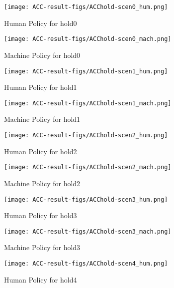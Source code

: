 \begin{figure}[h]
    \centering
    \texttt{[image: ACC-result-figs/ACChold-scen0\_hum.png]}
    \caption{Human Policy for hold0}
    \label{fig:hold-s0-hum}
\end{figure}

\begin{figure}[h]
    \centering
    \texttt{[image: ACC-result-figs/ACChold-scen0\_mach.png]}
    \caption{Machine Policy for hold0}
    \label{fig:hold-s0-mach}
\end{figure}

\begin{figure}[h]
    \centering
    \texttt{[image: ACC-result-figs/ACChold-scen1\_hum.png]}
    \caption{Human Policy for hold1}
    \label{fig:hold-s1-hum}
\end{figure}

\begin{figure}[h]
    \centering
    \texttt{[image: ACC-result-figs/ACChold-scen1\_mach.png]}
    \caption{Machine Policy for hold1}
    \label{fig:hold-s1-mach}
\end{figure}

\begin{figure}[h]
    \centering
    \texttt{[image: ACC-result-figs/ACChold-scen2\_hum.png]}
    \caption{Human Policy for hold2}
    \label{fig:hold-s2-hum}
\end{figure}

\begin{figure}[h]
    \centering
    \texttt{[image: ACC-result-figs/ACChold-scen2\_mach.png]}
    \caption{Machine Policy for hold2}
    \label{fig:hold-s2-mach}
\end{figure}

\begin{figure}[h]
    \centering
    \texttt{[image: ACC-result-figs/ACChold-scen3\_hum.png]}
    \caption{Human Policy for hold3}
    \label{fig:hold-s3-hum}
\end{figure}

\begin{figure}[h]
    \centering
    \texttt{[image: ACC-result-figs/ACChold-scen3\_mach.png]}
    \caption{Machine Policy for hold3}
    \label{fig:hold-s3-mach}
\end{figure}

\begin{figure}[h]
    \centering
    \texttt{[image: ACC-result-figs/ACChold-scen4\_hum.png]}
    \caption{Human Policy for hold4}
    \label{fig:hold-s4-hum}
\end{figure}

